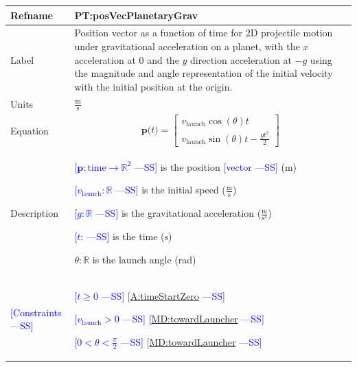 \documentclass[12pt]{article}
\newcommand{\authornote}[3]{\textcolor{#1}{[#3 ---#2]}}
\newcommand{\authornote}[3]{}
\newcommand{\wss}[1]{\authornote{blue}{SS}{#1}}
\begin{document}
\noindent \begin{minipage}{\textwidth}
\begin{tabular}{>{\raggedright}p{}>{\raggedright\arraybackslash}p{}}
\toprule \textbf{Refname} & \textbf{PT:posVecPlanetaryGrav} 
\label{PT:posVecPlanetaryGrav} \\ \midrule Label & Position vector as a function
of time for 2D projectile motion under gravitational acceleration on a planet,
with the $x$ acceleration at 0 and the $y$ direction acceleration at $-g$ using
the magnitude and angle representation of the initial velocity with the initial
position at the origin.
        
\\ \midrule
Units & $\frac{\text{m}}{\text{s}}$
        
\\ \midrule
Equation & \begin{displaymath}
           \symbf{p}\text{(}t\text{)}=\begin{bmatrix}
                                      {v}_{\text{launch}} \cos(\theta) t \\
                                      {v}_{\text{launch}} \sin(\theta) t - \frac{g t^2}{2}
                                      \end{bmatrix}
           \end{displaymath}
\\ \midrule
Description & \begin{symbDescription}
              \item{\wss{$\symbf{p}: \text{time} \rightarrow \mathbb{R}^2$} is the position \wss{vector} (${\text{m}}$)}
              \item{\wss{${{v}_{\text{launch}}}: \mathbb{R}$} is the initial speed ($\frac{\text{m}}{\text{s}}$)}
              \item{\wss{$g: \mathbb{R}$} is the gravitational acceleration ($\frac{\text{m}}{\text{s}^{2}}$)}
              \item{\wss{$t$: \text{time}} is the time (${\text{s}}$)}
              \item $\theta: \mathbb{R}$ is the launch angle (rad)
              \end{symbDescription}

\\ \midrule
\wss{Constraints} & 
\begin{symbDescription}
\item \wss{$t \geq 0$} \wss{\hyperref[timeStartZero]{A:timeStartZero}}
\item \wss{$v_\text{launch} > 0$} \wss{\hyperref[MD:towardLauncher]{MD:towardLauncher}}
\item \wss{$
0 < \theta < \frac{\pi}{2}$} \wss{\hyperref[MD:towardLauncher]{MD:towardLauncher}}
\end{symbDescription}


\end{tabular}
\end{minipage}
\end{document}
